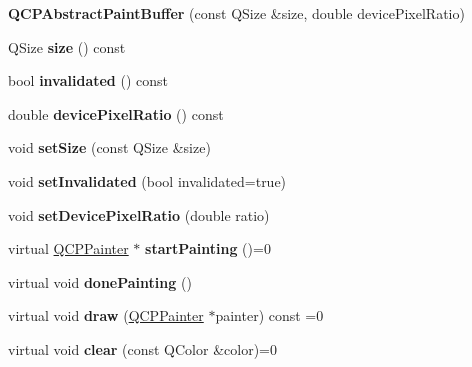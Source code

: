 \begin{DoxyCompactItemize}
{\bfseries Q\+C\+P\+Abstract\+Paint\+Buffer} (const Q\+Size \&size, double device\+Pixel\+Ratio)
\item 
\mbox{\label{class_q_c_p_abstract_paint_buffer_a3ea8284e547985c5d263f26a6adfa11f}} 
Q\+Size {\bfseries size} () const
\item 
\mbox{\label{class_q_c_p_abstract_paint_buffer_a76bf771cda945a6c602cf9b7d365d92b}} 
bool {\bfseries invalidated} () const
\item 
\mbox{\label{class_q_c_p_abstract_paint_buffer_aac1b981f8c1744036610ff1a6b9461f9}} 
double {\bfseries device\+Pixel\+Ratio} () const
\item 
\mbox{\label{class_q_c_p_abstract_paint_buffer_a8b68c3cd36533f1a4a23b5ce8cd66f01}} 
void {\bfseries set\+Size} (const Q\+Size \&size)
\item 
\mbox{\label{class_q_c_p_abstract_paint_buffer_ae4c7dc70dfc66be2879ce297b2b3d67f}} 
void {\bfseries set\+Invalidated} (bool invalidated=true)
\item 
\mbox{\label{class_q_c_p_abstract_paint_buffer_a555eaad5d5c806420ff35602a1bb68fa}} 
void {\bfseries set\+Device\+Pixel\+Ratio} (double ratio)
\item 
\mbox{\label{class_q_c_p_abstract_paint_buffer_a4840bb68102b9c04f716f550de66b2f3}} 
virtual \hyperlink{class_q_c_p_painter}{Q\+C\+P\+Painter} $\ast$ {\bfseries start\+Painting} ()=0
\item 
\mbox{\label{class_q_c_p_abstract_paint_buffer_a996577a718aecb3b9b5351fab797a062}} 
virtual void {\bfseries done\+Painting} ()
\item 
\mbox{\label{class_q_c_p_abstract_paint_buffer_a1f92e533105b575951eba5f01d8d129d}} 
virtual void {\bfseries draw} (\hyperlink{class_q_c_p_painter}{Q\+C\+P\+Painter} $\ast$painter) const =0
\item 
\mbox{\label{class_q_c_p_abstract_paint_buffer_a7fc69e37c2a8232e8b2eb8b5853aae4c}} 
virtual void {\bfseries clear} (const Q\+Color \&color)=0
\end{DoxyCompactItemize}
